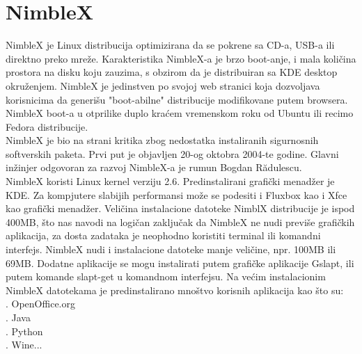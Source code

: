 \documentclass[12pt,vi]{mitthesis}
\begin{document}
\section*{NimbleX}
\indent
NimbleX\cite{NimbleX-wiki} je Linux distribucija optimizirana da se pokrene sa CD-a, USB-a ili direktno preko mreže. Karakteristika NimbleX-a je brzo boot-anje, i mala količina prostora na disku koju zauzima, s obzirom da je distribuiran sa KDE desktop okruženjem. NimbleX je jedinstven po svojoj web stranici koja dozvoljava korisnicima da generišu "boot-abilne" distribucije modifikovane putem browsera. NimbleX boot-a u otprilike duplo kraćem vremenskom roku od Ubuntu ili recimo Fedora distribucije.\\
NimbleX je bio na strani kritika zbog nedostatka instaliranih sigurnosnih softverskih paketa. Prvi put je objavljen 20-og oktobra 2004-te godine. Glavni inžinjer odgovoran za razvoj NimbleX-a je rumun Bogdan Rădulescu.\\
\indent
NimbleX koristi Linux kernel verziju 2.6. Predinstalirani grafički menadžer je KDE. Za kompjutere slabijih performansi može se podesiti i Fluxbox kao i Xfce kao grafički menadžer. Veličina instalacione datoteke NimblX distribucije je ispod 400MB, što nas navodi na logičan zaključak da NimbleX ne nudi previše grafičkih aplikacija, za dosta zadataka je neophodno koristiti terminal ili komandni interfejs. NimbleX nudi i instalacione datoteke manje veličine, npr. 100MB ili 69MB. Dodatne aplikacije se mogu instalirati putem grafičke aplikacije Gslapt, ili putem komande slapt-get u komandnom interfejsu. Na većim instalacionim NimbleX datotekama je predinstalirano mnoštvo korisnih aplikacija kao što su:\\
. OpenOffice.org\\
. Java\\
. Python\\
. Wine...
\end{document}
